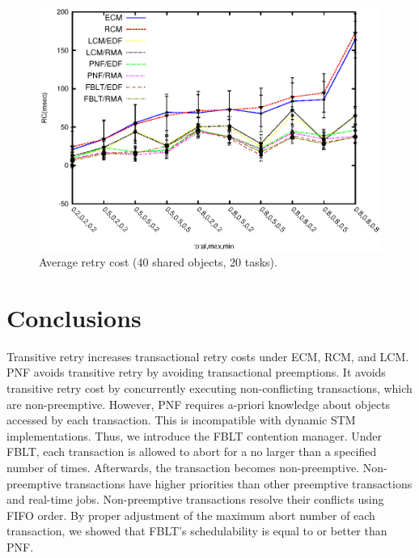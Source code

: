 \documentclass[conference,letterpaper]{IEEEtran}
\begin{document}
\begin{figure}
\centering
\includegraphics[scale=0.7]{figures/20_tasks/Abr_Dur/fblt/Abr_dur_20t_420obj_100wr_-1eta}
\caption{Average retry cost (40 shared objects, 20 tasks).}
\label{fig-RC-fblt-20t-40obj_non_transitive}
\end{figure}
%

\section{Conclusions}\label{conclusion}

Transitive retry increases transactional retry costs under ECM, RCM, and LCM. PNF avoids transitive retry by avoiding transactional preemptions. It avoids transitive retry cost by concurrently executing non-conflicting transactions, which are non-preemptive. However, PNF requires a-priori knowledge about objects accessed by each transaction. This is incompatible with dynamic STM implementations. Thus, we introduce the FBLT contention manager. Under  FBLT, each transaction is allowed to abort for a no larger than a specified number of times. Afterwards, the transaction becomes non-preemptive. Non-preemptive transactions have higher priorities than other preemptive transactions and real-time jobs. Non-preemptive transactions resolve their conflicts using FIFO order. 
%
By proper adjustment of the maximum abort number of each transaction, we showed that FBLT's schedulability is equal to or better than PNF. 
\end{document}
